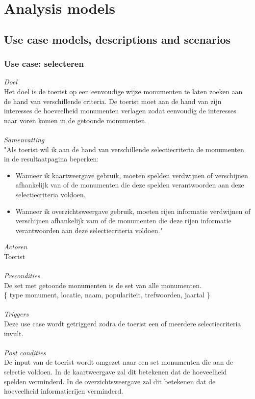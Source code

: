 \documentclass[a4paper,10pt]{article}
\newcommand{\rsection}[1]{
\section{#1}\label{sec:#1}
}
\newcommand{\rsubsection}[1]{
\subsection{#1}\label{sec:sub:#1}
}
\newcommand{\rsubsubsection}[1]{
\subsubsection{#1}\label{sec:sub:sub:#1}
}
\begin{document}
		\clearpage
		\rsection{Analysis models}
		\rsubsection{Use case models, descriptions and scenarios}
			\rsubsubsection{Use case: selecteren}
			\textit{Doel}\\
			Het doel is de toerist op een eenvoudige wijze monumenten te laten zoeken aan de hand van verschillende criteria. De toerist moet aan de hand van zijn interesses de hoeveelheid monumenten verlagen zodat eenvoudig de interesses naar voren komen in de getoonde monumenten.\\ \\
			\textit{Samenvatting}\\
			"Als toerist wil ik aan de hand van verschillende selectiecriteria de monumenten in de resultaatpagina beperken:
			\begin{itemize}
				\item Wanneer ik kaartweergave gebruik, moeten spelden verdwijnen of verschijnen afhankelijk van of de monumenten die deze spelden verantwoorden aan deze selectiecriteria voldoen.
				\item Wanneer ik overzichtsweergave gebruik, moeten rijen informatie verdwijnen of verschijnen afhankelijk vam of de monumenten die deze rijen informatie verantwoorden aan deze selectiecriteria voldoen."
			\end{itemize}
			\textit{Actoren}\\
			Toerist\\ \\
			\textit{Precondities}\\
			De set met getoonde monumenten is de set van alle monumenten.\\
			\{ type monument, locatie, naam, populariteit, trefwoorden, jaartal \} \\ \\
			\textit{Triggers}\\
			Deze use case wordt getriggerd zodra de toerist een of meerdere selectiecriteria invult.\\ \\
			\textit{Post condities}\\			
			De input van de toerist wordt omgezet naar een set monumenten die aan de selectie voldoen. In de kaartweergave zal dit betekenen dat de hoeveelheid spelden verminderd. In de overzichtsweergave zal dit betekenen dat de hoeveelheid informatierijen verminderd.		
			
\end{document}
